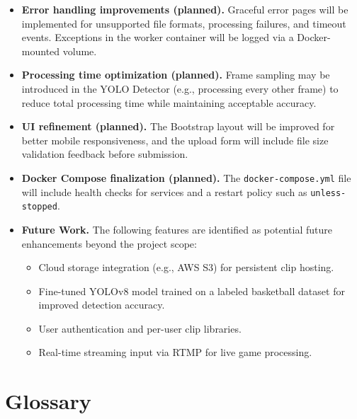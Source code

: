 \documentclass[12pt]{article}
\begin{document}
\begin{itemize}[noitemsep]
    \item \textbf{Error handling improvements (planned).} Graceful error pages will
          be implemented for unsupported file formats, processing failures, and
          timeout events. Exceptions in the worker container will be logged via a
          Docker-mounted volume.
    \item \textbf{Processing time optimization (planned).} Frame sampling may be
          introduced in the YOLO Detector (e.g., processing every other frame)
          to reduce total processing time while maintaining acceptable accuracy.
    \item \textbf{UI refinement (planned).} The Bootstrap layout will be improved
          for better mobile responsiveness, and the upload form will include file
          size validation feedback before submission.
    \item \textbf{Docker Compose finalization (planned).} The \texttt{docker-compose.yml}
          file will include health checks for services and a restart policy such
          as \texttt{unless-stopped}.
    \item \textbf{Future Work.} The following features are identified as potential
          future enhancements beyond the project scope:
          \begin{itemize}[noitemsep]
              \item Cloud storage integration (e.g., AWS S3) for persistent clip hosting.
              \item Fine-tuned YOLOv8 model trained on a labeled basketball dataset
                    for improved detection accuracy.
              \item User authentication and per-user clip libraries.
              \item Real-time streaming input via RTMP for live game processing.
          \end{itemize}
\end{itemize}

\newpage

\section{Glossary}
\end{document}

